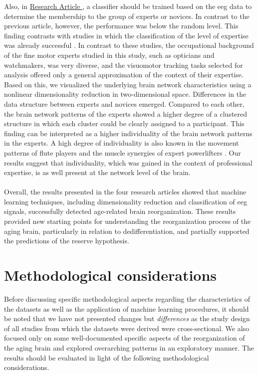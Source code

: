 Also, in \hyperref[results:paperIV]{Research Article }, a classifier should be trained based on the \gls{eeg} data to determine the membership to the group of experts or novices. In contrast to the previous article, however, the performance was below the random level. This finding contrasts with studies in which the classification of the level of expertise was already successful \cite{Hosp2021, Winkler-Schwartz2019, Shourie2016}. In contrast to these studies, the occupational background of the fine motor experts studied in this study, such as opticians and watchmakers, was very diverse, and the visuomotor tracking tasks selected for analysis offered only a general approximation of the context of their expertise. Based on this, we visualized the underlying brain network characteristics using a nonlinear dimensionality reduction in two-dimensional space. Differences in the data structure between experts and novices emerged. Compared to each other, the brain network patterns of the experts showed a higher degree of a clustered structure in which each cluster could be clearly assigned to a participant. This finding can be interpreted as a higher individuality of the brain network patterns in the experts. A high degree of individuality is also known in the movement patterns of flute players and the muscle synergies of expert powerlifters \cite{Albrecht2014, Caramiaux2018, Kristiansen2015}. Our results suggest that individuality, which was gained in the context of professional expertise, is as well present at the network level of the brain.\\
\\
Overall, the results presented in the four research articles showed that machine learning techniques, including dimensionality reduction and classification of \gls{eeg} signals, successfully detected age-related brain reorganization. These results provided new starting points for understanding the reorganization process of the aging brain, particularly in relation to dedifferentiation, and partially supported the predictions of the reserve hypothesis.

\section{Methodological considerations}
Before discussing specific methodological aspects regarding the characteristics of the datasets as well as the application of machine learning procedures, it should be noted that we have not presented changes but \textit{differences} as the study design of all studies from which the datasets were derived were cross-sectional. We also focused only on some well-documented specific aspects of the reorganization of the aging brain and explored overarching patterns in an exploratory manner. The results should be evaluated in light of the following methodological considerations. 

